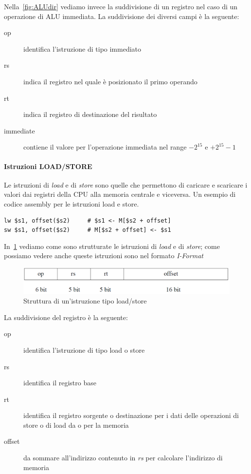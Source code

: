 Nella \figurename\,\ref{fig:ALUdir} vediamo invece la suddivisione di un registro nel caso di un operazione di ALU immediata.
La suddivisione dei diversi campi è la seguente:
\begin{description}
\item[op] identifica l'istruzione di tipo immediato
\item[rs] indica il registro nel quale è posizionato il primo operando
\item[rt] indica il registro di destinazione del risultato
\item[immediate] contiene il valore per l'operazione immediata nel range $-2^{15}$ e $+2^{15}-1$
\end{description}
\paragraph{Istruzioni LOAD/STORE}
Le istruzioni di \emph{load} e di \emph{store} sono quelle che permettono di caricare e scaricare i valori dai registri della CPU alla memoria centrale e viceversa.
Un esempio di codice assembly per le istruzioni load e store.
\begin{verbatim}
lw $s1, offset($s2)		# $s1 <- M[$s2 + offset]
sw $s1, offset($s2)		# M[$s2 + offset] <- $s1
\end{verbatim}
In \figurename\,\ref{fig:loadstore} vediamo come sono strutturate le istruzioni di \emph{load} e di \emph{store}; come possiamo vedere anche queste istruzioni sono nel formato \emph{I-Format}\\
\begin{figure}[htb]
\centering
\includegraphics[scale=0.4]{img/loadstore.png}
\caption{Struttura di un'istruzione tipo load/store}\label{fig:loadstore}
\end{figure}
La suddivisione del registro è la seguente:
\begin{description}
\item[op] identifica l'istruzione di tipo load o store
\item[rs] identifica il registro base
\item[rt] identifica il registro sorgente o destinazione per i dati delle operazioni di store o di load da o per la memoria
\item[offset] da sommare all'indirizzo contenuto in \emph{rs} per calcolare l'indirizzo di memoria
\end{description}
